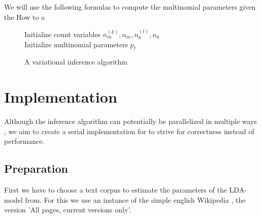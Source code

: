 \documentclass[12 pt,twopage]{article}
\begin{document}
We will use the following formulas to compute the multinomial parameters given the
How to a
\begin{figure}
 \begin{center}
  \begin{algorithm}[H]
   Initialize count variables \( n_m^{(k)} ,n_m, n_k^{(t)}, n_k \)\\
   Initialize multinomial parameters \(p_t\)
   
  \end{algorithm}
  \caption{A variational inference algorithm \cite{Heinrich2005}}\label{fig:algorithm}
 \end{center}
\end{figure}


\section{Implementation}
Although the inference algorithm can potentially be parallelized in multiple ways \cite{Newman2006ScalablePT,Wang2009PLDAPL}, we aim to create a serial implementation for to strive for correctness instead of performance.
\subsection{Preparation}
First we have to choose a text corpus to estimate the parameters of the LDA-model from. For this we use an instance of the simple english Wikipedia \cite{simplewi84:online}, the version 'All pages, current versions only'.
\end{document}
